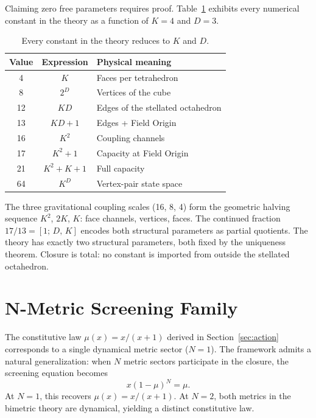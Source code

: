 \documentclass[twocolumn]{iopjournal}
\begin{document}
Claiming zero free parameters requires proof. Table~\ref{tab:constants} exhibits every numerical constant in the theory as a function of $K = 4$ and $D = 3$.

\begin{table}[h]
\centering
\caption{Every constant in the theory reduces to $K$ and $D$.}
\label{tab:constants}
\begin{tabular}{ccl}
\hline
Value & Expression & Physical meaning \\
\hline
4 & $K$ & Faces per tetrahedron \\
8 & $2^D$ & Vertices of the cube \\
12 & $KD$ & Edges of the stellated octahedron \\
13 & $KD + 1$ & Edges + Field Origin \\
16 & $K^2$ & Coupling channels \\
17 & $K^2 + 1$ & Capacity at Field Origin \\
21 & $K^2 + K + 1$ & Full capacity \\
64 & $K^D$ & Vertex-pair state space \\
\hline
\end{tabular}
\end{table}

The three gravitational coupling scales (16, 8, 4) form the geometric halving sequence $K^2$, $2K$, $K$: face channels, vertices, faces. The continued fraction $17/13 = [1;\, D,\, K]$ encodes both structural parameters as partial quotients. The theory has exactly two structural parameters, both fixed by the uniqueness theorem. Closure is total: no constant is imported from outside the stellated octahedron.


\section{N-Metric Screening Family}
\label{sec:nmetric}

The constitutive law $\mu(x) = x/(x+1)$ derived in Section~\ref{sec:action} corresponds to a single dynamical metric sector ($N = 1$). The framework admits a natural generalization: when $N$ metric sectors participate in the closure, the screening equation becomes
\begin{equation}
x(1 - \mu)^N = \mu.
\end{equation}
At $N = 1$, this recovers $\mu(x) = x/(x+1)$. At $N = 2$, both metrics in the bimetric theory are dynamical, yielding a distinct constitutive law.
\end{document}
